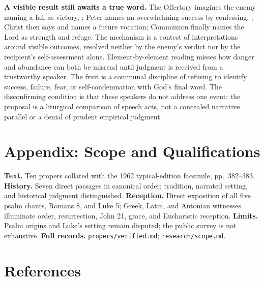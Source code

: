 \begin{deepstudy}
\noindent\textbf{A visible result still awaits a true word.\enspace{}}
The Offertory imagines the enemy naming a fall as victory, ; Peter names an overwhelming success by confessing, ; Christ then says  and names a future vocation; Communion finally names the Lord as strength and refuge. The mechanism is a contest of interpretations around visible outcomes, resolved neither by the enemy's verdict nor by the recipient's self-assessment alone. Element-by-element reading misses how danger and abundance can both be misread until judgment is received from a trustworthy speaker. The fruit is a communal discipline of refusing to identify success, failure, fear, or self-condemnation with God's final word. The disconfirming condition is that these speakers do not address one event: the proposal is a liturgical comparison of speech acts, not a concealed narrative parallel or a denial of prudent empirical judgment.

\clearpage

\section*{Appendix: Scope and Qualifications}

\begin{studyframe}
\textbf{Text.} Ten propers collated with the 1962 typical-edition facsimile, pp.~382--383. \textbf{History.} Seven direct passages in canonical order; tradition, narrated setting, and historical judgment distinguished. \textbf{Reception.} Direct exposition of all five psalm chants, Romans 8, and Luke 5; Greek, Latin, and Antonian witnesses illuminate order, resurrection, John 21, grace, and Eucharistic reception. \textbf{Limits.} Psalm origins and Luke's setting remain disputed; the public survey is not exhaustive. \textbf{Full records.} \nolinkurl{propers/verified.md}; \nolinkurl{research/scope.md}.
\end{studyframe}

\section*{References}


\end{deepstudy}
